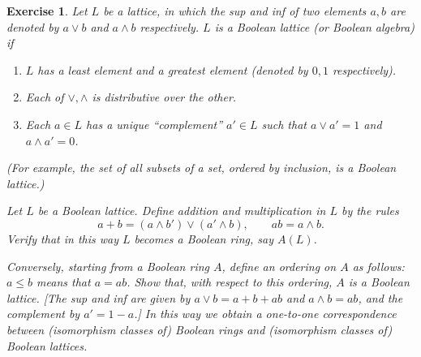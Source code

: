 \documentclass{article}
\theoremstyle{breakstyle}
\newtheorem{exercise}{Exercise}
\begin{document}
\begin{exercise}
Let \(L\) be a lattice, in which the sup and inf of two elements \(a,b\) are denoted by \(a\vee b\) and \(a\wedge b\) respectively. \(L\) is a Boolean lattice (or Boolean algebra) if
\begin{enumerate}[label=(\roman*)]
    \item \(L\) has a least element and a greatest element (denoted by \(0,1\) respectively).
    \item Each of \(\vee,\wedge\) is distributive over the other.
    \item Each \(a\in L\) has a unique ``complement'' \(a'\in L\) such that \(a\vee a'=1\) and \(a\wedge a'=0\).
\end{enumerate}
(For example, the set of all subsets of a set, ordered by inclusion, is a Boolean lattice.)

Let \(L\) be a Boolean lattice. Define addition and multiplication in \(L\) by the rules
\[
a+b=(a\wedge b')\vee(a'\wedge b),\qquad ab=a\wedge b.
\]
Verify that in this way \(L\) becomes a Boolean ring, say \(A(L)\).

Conversely, starting from a Boolean ring \(A\), define an ordering on \(A\) as follows: \(a\le b\) means that \(a=ab\). Show that, with respect to this ordering, \(A\) is a Boolean lattice. [The sup and inf are given by \(a\vee b=a+b+ab\) and \(a\wedge b=ab\), and the complement by \(a'=1-a\).] In this way we obtain a one-to-one correspondence between (isomorphism classes of) Boolean rings and (isomorphism classes of) Boolean lattices.


\end{exercise}
\end{document}
